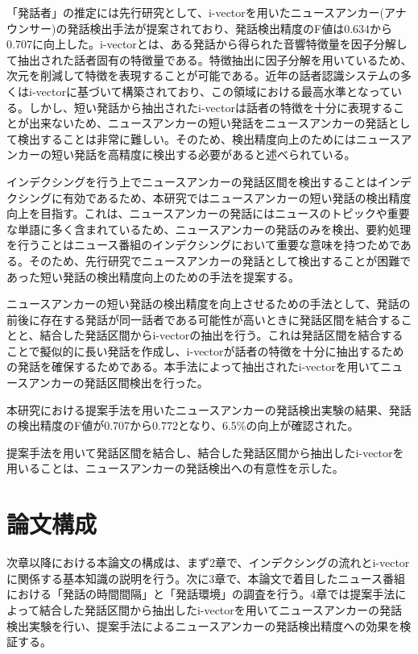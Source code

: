 「発話者」の推定には先行研究\cite{nozaki_gakuseikai}として、i-vectorを用いたニュースアンカー(アナウンサー)の発話検出手法が提案されており、発話検出精度のF値は0.634から0.707に向上した。i-vectorとは、ある発話から得られた音響特徴量を因子分解して抽出された話者固有の特徴量である。特徴抽出に因子分解を用いているため、次元を削減して特徴を表現することが可能である。近年の話者認識システムの多くはi-vectorに基づいて構築されており、この領域における最高水準となっている。しかし、短い発話から抽出されたi-vectorは話者の特徴を十分に表現することが出来ないため\cite{panaiv}、ニュースアンカーの短い発話をニュースアンカーの発話として検出することは非常に難しい。そのため、検出精度向上のためにはニュースアンカーの短い発話を高精度に検出する必要があると述べられている。\par

インデクシングを行う上でニュースアンカーの発話区間を検出することはインデクシングに有効であるため、本研究ではニュースアンカーの短い発話の検出精度向上を目指す。これは、ニュースアンカーの発話にはニュースのトピックや重要な単語に多く含まれているため、ニュースアンカーの発話のみを検出、要約処理を行うことはニュース番組のインデクシングにおいて重要な意味を持つためである。そのため、先行研究でニュースアンカーの発話として検出することが困難であった短い発話の検出精度向上のための手法を提案する。\par

ニュースアンカーの短い発話の検出精度を向上させるための手法として、発話の前後に存在する発話が同一話者である可能性が高いときに発話区間を結合することと、結合した発話区間からi-vectorの抽出を行う。これは発話区間を結合することで擬似的に長い発話を作成し、i-vectorが話者の特徴を十分に抽出するための発話を確保するためである。本手法によって抽出されたi-vectorを用いてニュースアンカーの発話区間検出を行った。\par

本研究における提案手法を用いたニュースアンカーの発話検出実験の結果、発話の検出精度のF値が0.707から0.772となり、6.5\%の向上が確認された。\par

提案手法を用いて発話区間を結合し、結合した発話区間から抽出したi-vectorを用いることは、ニュースアンカーの発話検出への有意性を示した。

\section{論文構成}
次章以降における本論文の構成は、まず2章で、インデクシングの流れとi-vectorに関係する基本知識の説明を行う。次に3章で、本論文で着目したニュース番組における「発話の時間間隔」と「発話環境」の調査を行う。4章では提案手法によって結合した発話区間から抽出したi-vectorを用いてニュースアンカーの発話検出実験を行い、提案手法によるニュースアンカーの発話検出精度への効果を検証する。

